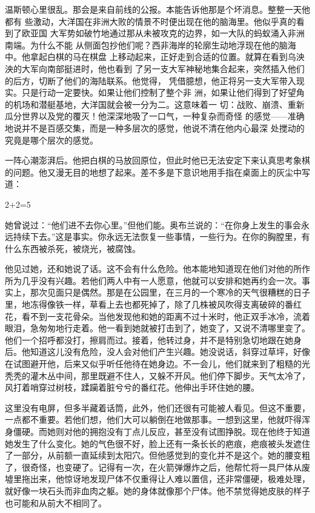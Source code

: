 温斯顿心里很乱。那会是来自前线的公报。本能告诉他那是个坏消息。整整一天他都有
些激动，大洋国在非洲大败的情景不时便出现在他的脑海里。他似乎真的看到了欧亚国
大军势如破竹地通过那从未被攻克的边界，如一大队的蚂蚁涌入非洲南端。为什么不能
从侧面包抄他们呢？西非海岸的轮廓生动地浮现在他的脑海中。他拿起白棋的马在棋盘
上移动起来，正好走到合适的位置。就算在看到乌泱泱的大军向南部挺进时，他也看到
了另一支大军神秘地集合起来，突然插入他们的后方，切断了他们的海陆联系。他觉得，
凭借臆想，他正将另一支大军带入现实。只是行动一定要快。如果让他们控制了整个非
洲，如果让他们得到了好望角的机场和潜艇基地，大洋国就会被一分为二。这意味着一
切：战败、崩溃、重新瓜分世界以及党的覆灭！他深深地吸了一口气，一种复杂而奇怪
的感觉——准确地说并不是百感交集，而是一种多层次的感觉，他说不清在他内心最深
处搅动的究竟是哪个层次的感觉。

一阵心潮澎湃后。他把白棋的马放回原位，但此时他已无法安定下来认真思考象棋的问题。他又漫无目的地想了起来。差不多是下意识地用手指在桌面上的灰尘中写道：

2+2=5

她曾说过：``他们进不去你心里。''但他们能。奥布兰说的：``在你身上发生的事会永远持续下去。''这是事实。你永远无法恢复一些事情，一些行为。在你的胸膛里，有什么东西被杀死，被烧光，被腐蚀。

他见过她，还和她说了话。这不会有什么危险。他本能地知道现在他们对他的所作所为几乎没有兴趣。若他们两人中有一人愿意，他就可以安排和她再约会一次。事实上，那次见面只是偶然。那是在公园里，在三月的一个寒冷的天气很糟糕的日子里，地冻得像铁一样，草看上去也都死掉了，除了几株被风吹得支离破碎的番红花，看不到一支花骨朵。当他发现他和她的距离不过十米时，他正双手冰冷，流着眼泪，急匆匆地行走着。他一看到她就被打击到了，她变了，又说不清哪里变了。他们一个招呼都没打，擦肩而过。接着，他转过身，并不是特别急切地跟在她身后。他知道这儿没有危险，没人会对他们产生兴趣。她没说话，斜穿过草坪，好像在试图避开他，后来又似乎听任他待在她身边。不一会儿，他们就来到了粗糙的光秃秃的灌木丛中间，那里既避不住人，又躲不开风。他们停下脚步。天气太冷了，风打着哨穿过树枝，蹂躏着脏兮兮的番红花。他伸出手环住她的腰。

这里没有电屏，但多半藏着话筒，此外，他们还很有可能被人看见。但这不重要，一点都不重要。若他们想，他们大可以躺倒在地做那事。一想到这里，他就吓得浑身僵硬。而她则对他的拥抱没有丁点儿反应，甚至没有试图挣脱。现在他终于知道她发生了什么变化。她的气色很不好，脸上还有一条长长的疤痕，疤痕被头发遮住了一部分，从前额一直延续到太阳穴。但他感觉到的变化并不是这个。她的腰变粗了，很奇怪，也变硬了。记得有一次，在火箭弹爆炸之后，他帮忙将一具尸体从废墟里拖出来，他惊讶地发现尸体不仅重得让人难以置信，还非常僵硬，极难处理，就好像一块石头而非血肉之躯。她的身体就像那个尸体。他不禁觉得她皮肤的样子也可能和从前大不相同了。

